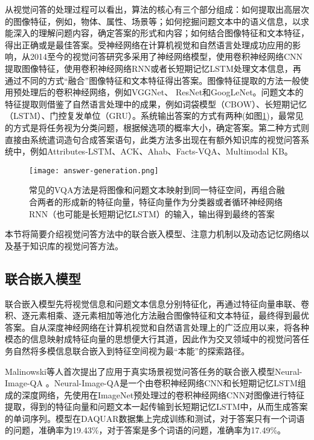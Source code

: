 从视觉问答的处理过程可以看出，算法的核心有三个部分组成：如何提取出高层次的图像特征，例如，物体、属性、场景等；如何挖掘问题文本中的语义信息，以求能深入的理解问题内容，确定答案的形式和内容；如何结合图像特征和文本特征，得出正确或是最佳答案。受神经网络在计算机视觉和自然语言处理成功应用的影响，从2014至今的视觉问答研究多采用了神经网络模型，使用卷积神经网络CNN提取图像特征，使用卷积神经网络RNN或者长短期记忆LSTM处理文本信息，再通过不同的方式“融合”图像特征和文本特征得出答案。图像特征提取的方法一般使用预处理后的卷积神经网络，例如VGGNet、 ResNet和GoogLeNet。问题文本的特征提取则借鉴了自然语言处理中的成果，例如词袋模型（CBOW）、长短期记忆（LSTM）、门控复发单位（GRU）。系统输出答案的方式有两种(如图\ref{answer-generation})，最常见的方式是将任务视为分类问题，根据候选项的概率大小，确定答案。第二种方式则直接由系统遣词造句合成答案语句，此类方法多出现在有额外知识库的视觉问答系统中，例如Attributes-LSTM、ACK、Ahab、Facts-VQA、Multimodal KB。
\begin{figure}[H]
	\centering
	\texttt{[image: answer-generation.png]}
	\caption{常见的VQA方法是将图像和问题文本映射到同一特征空间，再组合融合两者的形成新的特征向量，特征向量作为分类器或者循环神经网络RNN（也可能是长短期记忆LSTM）的输入，输出得到最终的答案}
	\label{answer-generation}
\end{figure}

本节将简要介绍视觉问答方法中的联合嵌入模型、注意力机制以及动态记忆网络以及基于知识库的视觉问答方法。

\subsection{联合嵌入模型}
联合嵌入模型先将视觉信息和问题文本信息分别特征化，再通过特征向量串联、卷积、逐元素相乘、逐元素相加等池化方法融合图像特征和文本特征，最终得到最优答案。自从深度神经网络在计算机视觉和自然语言处理上的广泛应用以来，将各种模态的信息映射成特征向量的思想便大行其道，因此作为交叉领域中的视觉问答任务自然将多模信息联合嵌入到特征空间视为最“本能”的探索路径。

Malinowski等人首次提出了应用于真实场景视觉问答任务的联合嵌入模型Neural-Image-QA
。Neural-Image-QA是一个由卷积神经网络CNN和长短期记忆LSTM组成的深度网络，先使用在ImageNet预处理过的卷积神经网络CNN对图像进行特征提取，得到的特征向量和问题文本一起传输到长短期记忆LSTM中，从而生成答案的单词序列。模型在DAQUAR数据集上完成训练和测试，对于答案只有一个词语的问题，准确率为19.43\%，对于答案是多个词语的问题，准确率为17.49\%。

